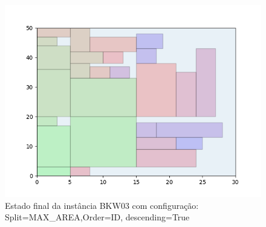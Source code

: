 \begin{figure}[H]
    \centering
    \caption[]{Estado final da instância BKW03 com configuração: Split=MAX_AREA,Order=ID, descending=True}
    \label{fig:bkw03-max_area-id-true}
    \includegraphics[scale=0.5]{output/figures/bkw/bkw03/max_area/id/true/00}
\end{figure}